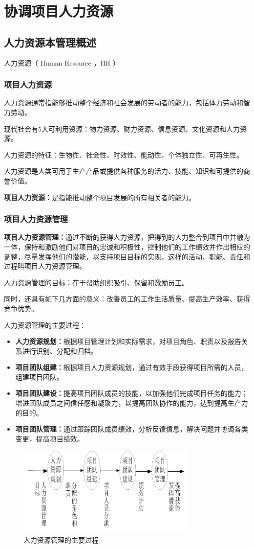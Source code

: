 \chapter{协调项目人力资源}
\section{人力资源本管理概述}
人力资源（ Human Resource ，HR ）
\subsection{项目人力资源}
人力资源通常指能够推动整个经济和社会发展的劳动者的能力，包括体力劳动和智力劳动。
\par 现代社会有5大可利用资源：物力资源、财力资源、信息资源、文化资源和人力资源。
\par 人力资源的特征：生物性、社会性、时效性、能动性、个体独立性、可再生性。
\par 人力资源是人类可用于生产产品或提供各种服务的活力、技能、知识和可提供的商誉价值。
\par\textbf{项目人力资源：}是指能推动整个项目发展的所有相关者的能力。
\subsection{项目人力资源管理}
\textbf{项目人力资源管理：}通过不断的获得人力资源，把得到的人力整合到项目中并融为一体，保持和激励他们对项目的忠诚和积极性，控制他们的工作绩效并作出相应的调整，尽量发挥他们的潜能，以支持项目目标的实现，这样的活动、职能、责任和过程叫项目人力资源管理。
\par 人力资源管理的目标：在于帮助组织吸引、保留和激励员工。
\par 同时，还具有如下几方面的意义：改善员工的工作生活质量、提高生产效率、获得竞争优势。
\par 人力资源管理的主要过程：
\begin{itemize}
	\item \textbf{人力资源规划：}根据项目管理计划和实际需求，对项目角色、职责以及报告关系进行识别、分配和归档。
	\item \textbf{项目团队组建：}根据项目人力资源规划，通过有效手段获得项目所需的人员，组建项目团队。
	\item \textbf{项目团队建设：}提高项目团队成员的技能，以加强他们完成项目任务的能力；增进团队成员之间信任感和凝聚力，以提高团队协作的能力，达到提高生产力的目的。
	\item \textbf{项目团队管理：}通过跟踪团队成员绩效，分析反馈信息，解决问题并协调各类变更，提高项目绩效。
\end{itemize}
\begin{figure}[!h]
	\centering
	\includegraphics[width=0.8\textwidth]{image/8-1}
	\caption{人力资源管理的主要过程}
\end{figure}
